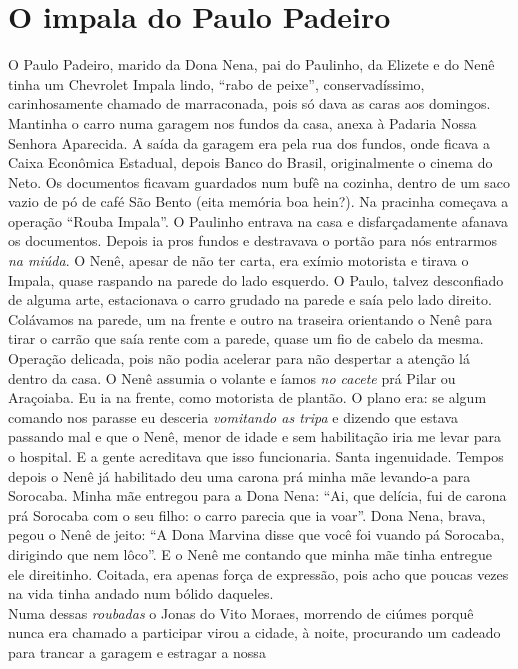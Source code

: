 \documentclass[12pt,brazil,]{book}
\begin{document}
\section{O impala do Paulo Padeiro}\label{o-impala-do-paulo-padeiro}

O Paulo Padeiro, marido da Dona Nena, pai do Paulinho, da Elizete e do
Nenê tinha um Chevrolet Impala lindo, ``rabo de peixe'',
conservadíssimo, carinhosamente chamado de marraconada, pois só dava as
caras aos domingos. Mantinha o carro numa garagem nos fundos da casa,
anexa à Padaria Nossa Senhora Aparecida. A saída da garagem era pela rua
dos fundos, onde ficava a Caixa Econômica Estadual, depois Banco do
Brasil, originalmente o cinema do Neto. Os documentos ficavam guardados
num bufê na cozinha, dentro de um saco vazio de pó de café São Bento
(eita memória boa hein?). Na pracinha começava a operação ``Rouba
Impala''. O Paulinho entrava na casa e disfarçadamente afanava os
documentos. Depois ia pros fundos e destravava o portão para nós
entrarmos \emph{na miúda}. O Nenê, apesar de não ter carta, era exímio
motorista e tirava o Impala, quase raspando na parede do lado esquerdo.
O Paulo, talvez desconfiado de alguma arte, estacionava o carro grudado
na parede e saía pelo lado direito. Colávamos na parede, um na frente e
outro na traseira orientando o Nenê para tirar o carrão que saía rente
com a parede, quase um fio de cabelo da mesma. Operação delicada, pois
não podia acelerar para não despertar a atenção lá dentro da casa. O
Nenê assumia o volante e íamos \emph{no cacete} prá Pilar ou Araçoiaba.
Eu ia na frente, como motorista de plantão. O plano era: se algum
comando nos parasse eu desceria \emph{vomitando as tripa} e dizendo que
estava passando mal e que o Nenê, menor de idade e sem habilitação iria
me levar para o hospital. E a gente acreditava que isso funcionaria.
Santa ingenuidade. Tempos depois o Nenê já habilitado deu uma carona prá
minha mãe levando-a para Sorocaba. Minha mãe entregou para a Dona Nena:
``Ai, que delícia, fui de carona prá Sorocaba com o seu filho: o carro
parecia que ia voar''. Dona Nena, brava, pegou o Nenê de jeito: ``A Dona
Marvina disse que você foi vuando pá Sorocaba, dirigindo que nem lôco''.
E o Nenê me contando que minha mãe tinha entregue ele direitinho.
Coitada, era apenas força de expressão, pois acho que poucas vezes na
vida tinha andado num bólido daqueles.\\
Numa dessas \emph{roubadas} o Jonas do Vito Moraes, morrendo de ciúmes
porquê nunca era chamado a participar virou a cidade, à noite,
procurando um cadeado para trancar a garagem e estragar a nossa
\end{document}
